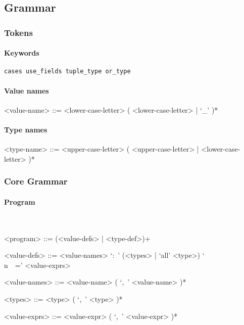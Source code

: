 \documentclass{article}
\begin{document}
\subsection{Grammar}
\subsubsection{Tokens}

\paragraph{Keywords}

\begin{verbatim}
cases use_fields tuple_type or_type
\end{verbatim}

\paragraph{Value names}

\begin{grammar}
<value-name> ::= 
<lower-case-letter> ( <lower-case-letter> | `_' )*
\end{grammar}

\paragraph{Type names}

\begin{grammar}
<type-name> ::= 
<upper-case-letter> ( <upper-case-letter> | <lower-case-letter> )*
\end{grammar}



\subsubsection{Core Grammar}

\setlength{\grammarparsep}{20pt}
\setlength{\grammarindent}{12em}

\paragraph{Program}
\hspace{1cm}\\
\begin{grammar}

<program> ::= (<value-defs> | <type-def>)+

<value-defs> ::=
<value-names> `:\ ' (<types> | `all' <type>) `\\n\ \ =' <value-exprs>

<value-names> ::= <value-name> ( `,\ ' <value-name> )*  

<types> ::= <type> ( `,\ ' <type> )*  

<value-exprs> ::= <value-expr> ( `,\ ' <value-expr> )*  

\end{grammar}
\hspace{1cm}\\
\end{document}
